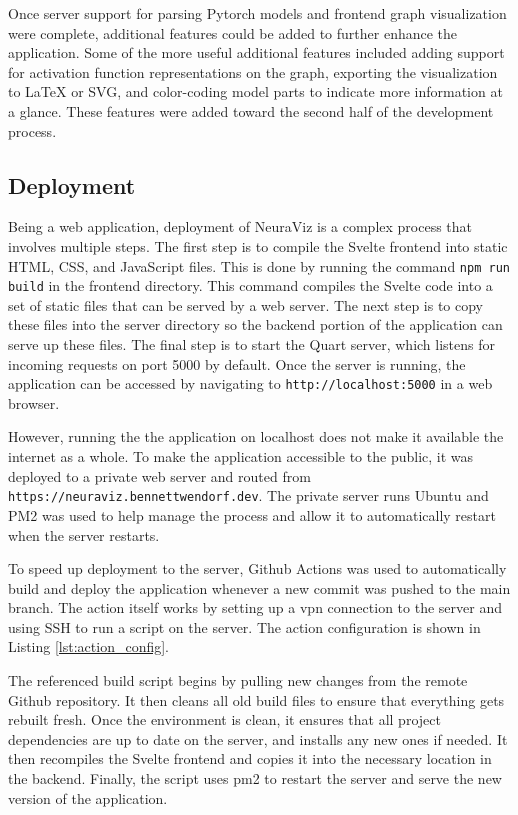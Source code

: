 Once server support for parsing Pytorch models and frontend graph visualization were complete, additional features could be added to further enhance the application. Some of the more useful additional features included adding support for activation function representations on the graph, exporting the visualization to LaTeX or SVG, and color-coding model parts to indicate more information at a glance. These features were added toward the second half of the development process.

\subsection{Deployment}
Being a web application, deployment of NeuraViz is a complex process that involves multiple steps. The first step is to compile the Svelte frontend into static HTML, CSS, and JavaScript files. This is done by running the command \texttt{npm run build} in the frontend directory. This command compiles the Svelte code into a set of static files that can be served by a web server. The next step is to copy these files into the server directory so the backend portion of the application can serve up these files. The final step is to start the Quart server, which listens for incoming requests on port 5000 by default. Once the server is running, the application can be accessed by navigating to \texttt{http://localhost:5000} in a web browser.

However, running the the application on localhost does not make it available the internet as a whole. To make the application accessible to the public, it was deployed to a private web server and routed from \texttt{https://neuraviz.bennettwendorf.dev}. The private server runs Ubuntu and PM2 \cite{pm2} was used to help manage the process and allow it to automatically restart when the server restarts.

To speed up deployment to the server, Github Actions was used to automatically build and deploy the application whenever a new commit was pushed to the main branch. The action itself works by setting up a vpn connection to the server and using SSH to run a script on the server. The action configuration is shown in Listing \ref{lst:action_config}.

\begin{center}
    
    \label{lst:action_config}
\end{center}

The referenced build script begins by pulling new changes from the remote Github repository. It then cleans all old build files to ensure that everything gets rebuilt fresh. Once the environment is clean, it ensures that all project dependencies are up to date on the server, and installs any new ones if needed. It then recompiles the Svelte frontend and copies it into the necessary location in the backend. Finally, the script uses pm2 to restart the server and serve the new version of the application.